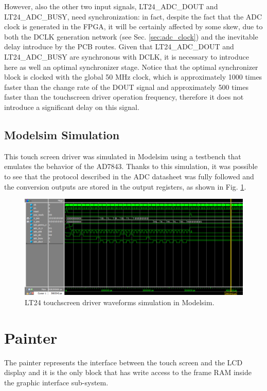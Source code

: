 \documentclass[11pt]{report}
\begin{document}
However, also the other two input signals, LT24\_ADC\_DOUT and LT24\_ADC\_BUSY, need synchronization: in fact, despite the fact that the ADC clock is generated in the FPGA, it will be certainly affected by some skew, due to both the DCLK generation network (see Sec. \ref{sec:adc_clock}) and the inevitable delay introduce by the PCB routes. Given that LT24\_ADC\_DOUT and LT24\_ADC\_BUSY are synchronous with DCLK, it is necessary to introduce here as well an optimal synchronizer stage. Notice that the optimal synchronizer block is clocked with the global 50 MHz clock, which is approximately 1000 times faster than the change rate of the DOUT signal and approximately 500 times faster than the touchscreen driver operation frequency, therefore it does not introduce a significant delay on this signal.

\subsection{Modelsim Simulation}
This touch screen driver was simulated in Modelsim using a testbench that emulates the behavior of the AD7843. Thanks to this simulation, it was possible to see that the protocol described in the ADC datasheet was fully followed and the conversion outputs are stored in the output registers, as shown in Fig. \ref{fig:touchscreen_simulation}.

\begin{figure}[!ht]
    \centering
    \includegraphics[width=1\linewidth]{images/graphic_interface_design/LT24_touchscreen_driver/touchscreen_simulation.png}
    \caption{LT24 touchscreen driver waveforms simulation in Modelsim.}
    \label{fig:touchscreen_simulation}
\end{figure}

\section{Painter}\label{sec:painter}
The painter represents the interface between the touch screen and the LCD display and it is the only block that has write access to the frame RAM inside the graphic interface sub-system. 
\end{document}
